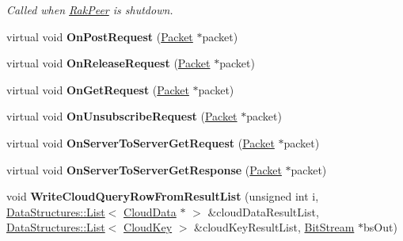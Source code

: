 \begin{DoxyCompactItemize}
\begin{DoxyCompactList}\small\item\em Called when \hyperlink{class_rak_net_1_1_rak_peer}{Rak\-Peer} is shutdown. \end{DoxyCompactList}\item 
\hypertarget{class_rak_net_1_1_cloud_server_a5bc55275a58f15a7b316c303ca20280d}{virtual void {\bfseries On\-Post\-Request} (\hyperlink{struct_rak_net_1_1_packet}{Packet} $\ast$packet)}\label{class_rak_net_1_1_cloud_server_a5bc55275a58f15a7b316c303ca20280d}

\item 
\hypertarget{class_rak_net_1_1_cloud_server_a9480ce15cdb2e6e7cf35ee68059839de}{virtual void {\bfseries On\-Release\-Request} (\hyperlink{struct_rak_net_1_1_packet}{Packet} $\ast$packet)}\label{class_rak_net_1_1_cloud_server_a9480ce15cdb2e6e7cf35ee68059839de}

\item 
\hypertarget{class_rak_net_1_1_cloud_server_af1f4b70453c2a977cc8218622f1019de}{virtual void {\bfseries On\-Get\-Request} (\hyperlink{struct_rak_net_1_1_packet}{Packet} $\ast$packet)}\label{class_rak_net_1_1_cloud_server_af1f4b70453c2a977cc8218622f1019de}

\item 
\hypertarget{class_rak_net_1_1_cloud_server_a40e7c56ced609adac1516895bbbfb44a}{virtual void {\bfseries On\-Unsubscribe\-Request} (\hyperlink{struct_rak_net_1_1_packet}{Packet} $\ast$packet)}\label{class_rak_net_1_1_cloud_server_a40e7c56ced609adac1516895bbbfb44a}

\item 
\hypertarget{class_rak_net_1_1_cloud_server_a8da847441fad13237f511da221844992}{virtual void {\bfseries On\-Server\-To\-Server\-Get\-Request} (\hyperlink{struct_rak_net_1_1_packet}{Packet} $\ast$packet)}\label{class_rak_net_1_1_cloud_server_a8da847441fad13237f511da221844992}

\item 
\hypertarget{class_rak_net_1_1_cloud_server_ac94f47dc2acc013e987faa194ee90311}{virtual void {\bfseries On\-Server\-To\-Server\-Get\-Response} (\hyperlink{struct_rak_net_1_1_packet}{Packet} $\ast$packet)}\label{class_rak_net_1_1_cloud_server_ac94f47dc2acc013e987faa194ee90311}

\item 
\hypertarget{class_rak_net_1_1_cloud_server_a8c372fb141eaec147adfa1a37a8cf7e8}{void {\bfseries Write\-Cloud\-Query\-Row\-From\-Result\-List} (unsigned int i, \hyperlink{class_data_structures_1_1_list}{Data\-Structures\-::\-List}$<$ \hyperlink{struct_rak_net_1_1_cloud_server_1_1_cloud_data}{Cloud\-Data} $\ast$ $>$ \&cloud\-Data\-Result\-List, \hyperlink{class_data_structures_1_1_list}{Data\-Structures\-::\-List}$<$ \hyperlink{struct_rak_net_1_1_cloud_key}{Cloud\-Key} $>$ \&cloud\-Key\-Result\-List, \hyperlink{class_rak_net_1_1_bit_stream}{Bit\-Stream} $\ast$bs\-Out)}\label{class_rak_net_1_1_cloud_server_a8c372fb141eaec147adfa1a37a8cf7e8}


\end{DoxyCompactItemize}
